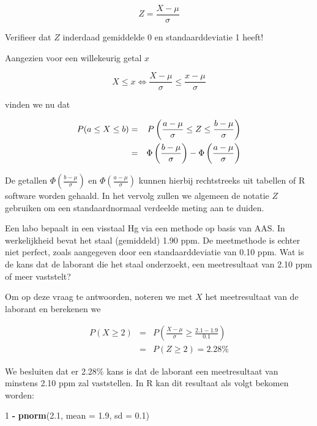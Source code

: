 \documentclass[12pt,dutch,coursenotes]{book}
\newenvironment{Shaded}{\begin{snugshade}}{\end{snugshade}}
\newcommand{\KeywordTok}[1]{\textcolor[rgb]{0.13,0.29,0.53}{\textbf{#1}}}
\newcommand{\DataTypeTok}[1]{\textcolor[rgb]{0.13,0.29,0.53}{#1}}
\newcommand{\DecValTok}[1]{\textcolor[rgb]{0.00,0.00,0.81}{#1}}
\newcommand{\FloatTok}[1]{\textcolor[rgb]{0.00,0.00,0.81}{#1}}
\newcommand{\StringTok}[1]{\textcolor[rgb]{0.31,0.60,0.02}{#1}}
\newcommand{\OperatorTok}[1]{\textcolor[rgb]{0.81,0.36,0.00}{\textbf{#1}}}
\newcommand{\NormalTok}[1]{#1}
\theoremstyle{definition}
\theoremstyle{definition}
\theoremstyle{definition}
\theoremstyle{remark}
\let\BeginKnitrBlock\begin \let\EndKnitrBlock\end
\begin{document}
\begin{equation*}
Z = \frac{X- \mu}{\sigma}
\end{equation*}

Verifieer dat \(Z\) inderdaad gemiddelde 0 en standaarddeviatie 1 heeft!

Aangezien voor een willekeurig getal \(x\)

\begin{equation*}
X\leq x \Leftrightarrow \frac{X-\mu}{\sigma} \leq \frac{x-\mu}{\sigma}
\end{equation*}

vinden we nu dat

\begin{eqnarray*}
P(a \leq X \leq b) & = & P\left(\frac{a-\mu}{\sigma} \leq Z \leq \frac{b-\mu%
}{\sigma} \right) \\
& = & \Phi \left (\frac{b-\mu}{\sigma} \right ) - \Phi \left (\frac{a-\mu}{%
\sigma} \right )
\end{eqnarray*}

De getallen \(\Phi \left (\frac{b-\mu}{\sigma} \right )\) en
\(\Phi \left (\frac{a-\mu}{\sigma} \right )\) kunnen hierbij
rechtstreeks uit tabellen of R software worden gehaald. In het vervolg
zullen we algemeen de notatie \(Z\) gebruiken om een standaardnormaal
verdeelde meting aan te duiden.

\BeginKnitrBlock{exercise}
\protect\hypertarget{exr:unnamed-chunk-49}{}{\label{exr:unnamed-chunk-49} }
\EndKnitrBlock{exercise} Een labo bepaalt in een visstaal Hg via een
methode op basis van AAS. In werkelijkheid bevat het staal (gemiddeld)
1.90 ppm. De meetmethode is echter niet perfect, zoals aangegeven door
een standaarddeviatie van 0.10 ppm. Wat is de kans dat de laborant die
het staal onderzoekt, een meetresultaat van 2.10 ppm of meer vaststelt?

Om op deze vraag te antwoorden, noteren we met \(X\) het meetresultaat
van de laborant en berekenen we

\begin{eqnarray*}
P(X\geq 2)&=&P\left(\frac{X-\mu}{\sigma}\geq \frac{2.1-1.9}{0.1}\right) \\
&=&P(Z\geq 2) = 2.28\%
\end{eqnarray*}

We besluiten dat er 2.28\% kans is dat de laborant een meetresultaat van
minstens 2.10 ppm zal vaststellen. In R kan dit resultaat als volgt
bekomen worden:

\begin{Shaded}
\begin{Highlighting}[]
\DecValTok{1} \OperatorTok{-}\StringTok{ }\KeywordTok{pnorm}\NormalTok{(}\FloatTok{2.1}\NormalTok{, }\DataTypeTok{mean =} \FloatTok{1.9}\NormalTok{, }\DataTypeTok{sd =} \FloatTok{0.1}\NormalTok{)}
\end{Highlighting}
\end{Shaded}
\end{document}
